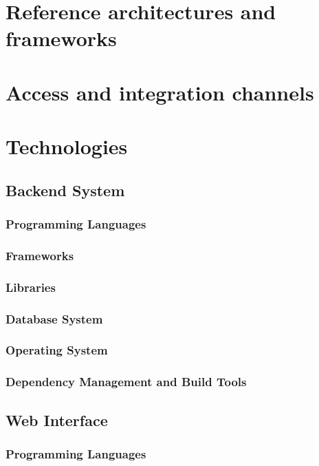 \documentclass[a4paper,10pt]{article}
\begin{document}
\section{Reference architectures and frameworks}
 
\section{Access and integration channels}

\section{Technologies}
\subsection{Backend System}
\subsubsection{Programming Languages}
\subsubsection{Frameworks}
\subsubsection{Libraries}
\subsubsection{Database System}
\subsubsection{Operating System}
\subsubsection{Dependency Management and Build Tools}

\subsection{Web Interface}
\subsubsection{Programming Languages}
\end{document}
